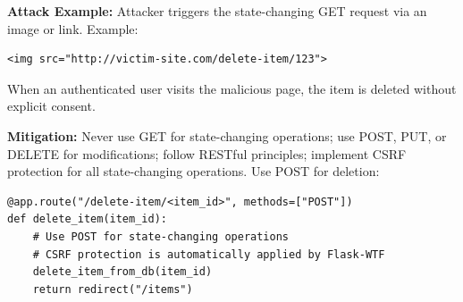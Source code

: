 \textbf{Attack Example:} Attacker triggers the state-changing GET request via an image or link. Example:
\begin{lstlisting}[style=attackcode]
<img src="http://victim-site.com/delete-item/123">
\end{lstlisting}
When an authenticated user visits the malicious page, the item is deleted without explicit consent.

\textbf{Mitigation:} Never use GET for state-changing operations; use POST, PUT, or DELETE for modifications; follow RESTful principles; implement CSRF protection for all state-changing operations. Use POST for deletion:

\begin{lstlisting}[style=pycode]
@app.route("/delete-item/<item_id>", methods=["POST"])
def delete_item(item_id):
    # Use POST for state-changing operations
    # CSRF protection is automatically applied by Flask-WTF
    delete_item_from_db(item_id)
    return redirect("/items")
\end{lstlisting}
